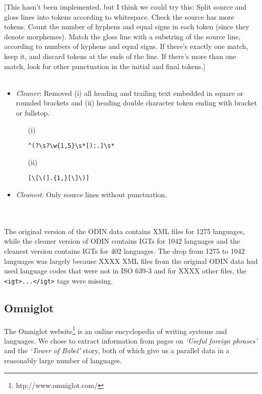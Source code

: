 \documentclass[11pt]{article}
\begin{document}
[This hasn't been implemented, but I think we could try this: Split source and gloss lines into tokens according to whitespace. Check the source has more tokens. Count the number of hyphens and equal signs in each token (since they denote morphemes). Match the gloss line with a substring of the source line, according to numbers of hyphens and equal signs. If there's exactly one match, keep it, and discard tokens at the ends of the line. If there's more than one match, look for other punctuation in the initial and final tokens.]
\\ \\
\begin{minipage}{\columnwidth}
\begin{itemize}
\item \emph{Cleaner}: Removed (i) all heading and trailing text embedded in square or rounded brackets and (ii) heading double character token ending with bracket or fullstop.
\begin{itemize}
\item[(i)]
\begin{Verbatim}
^(?\s?\w{1,5}\s*[):.]\s*
\end{Verbatim}
\item[(ii)] 
\begin{Verbatim}
[\[\(].{1,}[\]\)]
\end{Verbatim}
\end{itemize}
\item \emph{Cleanest}: Only source lines without punctuation.
\end{itemize}
\end{minipage}
\\ \\

\noindent The original version of the ODIN data contains XML files for 1275 languages, while the cleaner version of ODIN contains IGTs for 1042 languages and the cleanest version contains IGTs for 402 languages. The drop from 1275 to 1042 languages was largely because {\color{red} XXXX} XML files from the original ODIN data had used language codes that were not in ISO 639-3 and for {\color{red} XXXX} other files, the \texttt{<igt>...</igt>} tags were missing. 

\subsection{Omniglot}

The Omniglot website\footnote{htp://www.omniglot.com/} is an online encyclopedia of writing systems and languages. We chose to extract information from pages on \emph{`Useful foreign phrases'} and the \emph{`Tower of Babel'} story, both of which give us a parallel data in a reasonably large number of languages.
\end{document}
